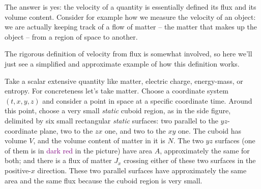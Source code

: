 \documentclass[a4paper,12pt,%
onecolumn,oneside,%
british%
]{memoir}
\renewcommand*{\|}[1][]{\nonscript\:#1\vert\nonscript\:\mathopen{}}
\newcommand*{\energym}{energy-mass}
\newcommand*{\yN}{N}
\newcommand*{\yJ}{J}
\begin{document}
The answer is yes: the velocity of a quantity is essentially defined its flux and its volume content. Consider for example how we measure the velocity of an object: we are actually keeping track of a flow of matter -- the matter that makes up the object -- from a region of space to another.

The rigorous definition of velocity from flux is somewhat involved, so here we'll just see a simplified and approximate example of how this definition works.

Take a scalar extensive quantity like matter, electric charge, \energym, or entropy. For concreteness let's take matter. Choose a coordinate system $(t,x,y,z)$ and consider a point in space at a specific coordinate time.
%
%
Around this point, choose a very small \emph{static} cuboid region, as in the side figure, delimited by six small rectangular \emph{static} surfaces: two parallel to the $yz$-coordinate plane, two to the $zx$ one, and two to the $xy$ one. The cuboid has volume $V$, and the volume content of matter in it is $\yN$. The two $yz$ surfaces (one of them is in \textcolor{purple}{dark red} in the picture) have area $A$, approximately the same for both; and there is a flux of matter $\yJ_{x}$ crossing either of these two surfaces in the positive-$x$ direction. These two parallel surfaces have approximately the same area and the same flux because the cuboid region is very small.
\end{document}
